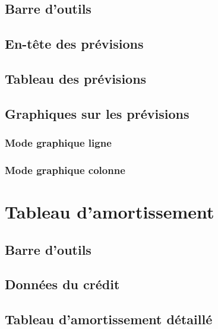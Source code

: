 \subsection{Barre d'outils\label{budget-estimate-functions}}


\subsection{En-tête des prévisions\label{budget-estimate-summary}}

\subsection{Tableau des prévisions\label{budget-estimate-table}}


\subsection{Graphiques sur les prévisions\label{budget-ertimate-chart}}

\subsubsection{Mode graphique ligne}

\subsubsection{Mode graphique colonne}

\section{Tableau d'amortissement\label{budget-amortization}}


\subsection{Barre d'outils\label{budget-amortization-functions}}

\subsection{Données du crédit\label{budget-amortization-data}}


\subsection{Tableau d'amortissement détaillé\label{budget-amortization-table}}


